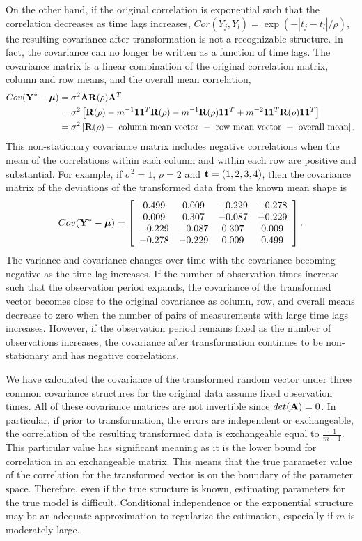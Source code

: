  On the other hand, if the original correlation is exponential such that the correlation decreases as time lags increases, $Cor(Y_{j},Y_{l}) = \exp(-|t_{j}-t_{l}|/\rho)$, the resulting covariance after transformation is not a recognizable structure. In fact, the covariance can no longer be written as a function of time lags. The covariance matrix is a linear combination of the original correlation matrix, column and row means, and the overall mean correlation,
   \begin{align*}
 Cov(\mathbf Y^{*}- \boldsymbol\mu) &= \sigma^{2}\mathbf A\mathbf R(\rho)\mathbf A^{T}\\
 &= \sigma^{2}\left[\mathbf R(\rho)-m^{-1}\mathbf1\mathbf1^{T}\mathbf R(\rho)-m^{-1}\mathbf R(\rho)\mathbf1\mathbf1^{T} + m^{-2}\mathbf1\mathbf1^{T}\mathbf R(\rho)\mathbf1\mathbf1^{T}\right]\\
  &= \sigma^{2}\left[\mathbf R(\rho)-\text{ column mean vector }-\text{ row mean vector } + \text{ overall mean}\right].
 \end{align*} 
 This non-stationary covariance matrix includes negative correlations when the mean of the correlations within each column and within each row are positive and substantial. For example, if $\sigma^{2}=1$, $\rho = 2$ and $\mathbf t=(1,2,3,4)$, then the covariance matrix of the deviations of the transformed data from the known mean shape is
$$ Cov(\mathbf Y^{*}- \boldsymbol\mu) = \left[ \begin{array}{cccc}
 0.499&  0.009& -0.229& -0.278\\
  0.009&  0.307& -0.087& -0.229\\
 -0.229& -0.087&  0.307&  0.009\\
 -0.278& -0.229&  0.009&  0.499
\end{array}\right].$$
The variance and covariance changes over time with the covariance becoming negative as the time lag increases.  If the number of observation times increase such that the observation period expands, the covariance of the transformed vector becomes close to the original covariance as column, row, and overall means decrease to zero when the number of pairs of measurements with large time lags increases. However, if the observation period remains fixed as the number of observations increases, the covariance after transformation continues to be non-stationary and has negative correlations.  

We have calculated the covariance of the transformed random vector under three common covariance structures for the original data assume fixed observation times. All of these covariance matrices are not invertible since $det(\mathbf A) = 0$. In particular, if prior to transformation, the errors are independent or exchangeable, the correlation of the resulting transformed data is exchangeable equal to $\frac{-1}{m-1}$. This particular value has significant meaning as it is the lower bound for correlation in an exchangeable matrix. This means that the true parameter value of the correlation for the transformed vector is on the boundary of the parameter space. Therefore, even if the true structure is known, estimating parameters for the true model is difficult. Conditional independence or the exponential structure may be an adequate approximation to regularize the estimation, especially if $m$ is moderately large.

